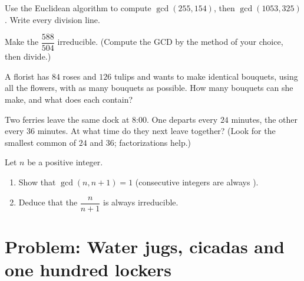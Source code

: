 \begin{exercise}[$\star\star$]\label{exo:g9:arith:6}
Use the Euclidean algorithm to compute $\gcd(255, 154)$, then
$\gcd(1053, 325)$. Write every division line.
\end{exercise}

\begin{exercise}[$\star\star$]\label{exo:g9:arith:7}
Make the  $\dfrac{588}{504}$ irreducible. (Compute the GCD by the
method of your choice, then divide.)
\end{exercise}

\begin{exercise}[$\star\star$]\label{exo:g9:arith:8}
A florist has $84$ roses and $126$ tulips and wants to make identical
bouquets, using all the flowers, with as many bouquets as possible.
How many bouquets can she make, and what does each contain?
\end{exercise}

\begin{exercise}[$\star\star$]\label{exo:g9:arith:9}
Two ferries leave the same dock at 8:00. One departs every $24$ minutes,
the other every $36$ minutes. At what time do they next leave together?
(Look for the smallest common  of $24$ and $36$; factorizations
help.)
\end{exercise}

\begin{exercise}[$\star\star\star$]\label{exo:g9:arith:10}
Let $n$ be a positive integer.
\begin{enumerate}
  \item Show that $\gcd(n, n+1) = 1$ (consecutive integers are always
        ).
  \item Deduce that the  $\dfrac{n}{n+1}$ is always irreducible.
\end{enumerate}
\end{exercise}

\section{Problem: Water jugs, cicadas and one hundred lockers}

